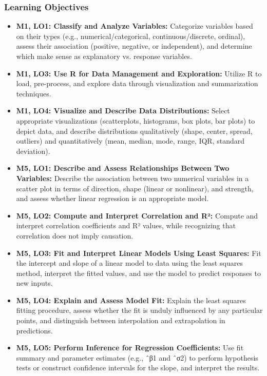 \begin{frame}
    \frametitle{Learning Objectives}
    \begin{itemize}
        \item \textbf{M1, LO1: Classify and Analyze Variables:} Categorize variables based on their types (e.g., numerical/categorical, continuous/discrete, ordinal), assess their association (positive, negative, or independent), and determine which make sense as explanatory vs. response variables.
        \item \textbf{M1, LO3: Use R for Data Management and Exploration:} Utilize R to load, pre-process, and explore data through visualization and summarization techniques.
        \item \textbf{M1, LO4: Visualize and Describe Data Distributions:} Select appropriate visualizations (scatterplots, histograms, box plots, bar plots) to depict data, and describe distributions qualitatively (shape, center, spread, outliers) and quantitatively (mean, median, mode, range, IQR, standard deviation).
        \item \textbf{M5, LO1: Describe and Assess Relationships Between Two Variables:} Describe the association between two numerical variables in a scatter plot in terms of direction, shape (linear or nonlinear), and strength, and assess whether linear regression is an appropriate model.    
        \item \textbf{M5, LO2: Compute and Interpret Correlation and R²:} Compute and interpret correlation coefficients and R² values, while recognizing that correlation does not imply causation. 
        \item \textbf{M5, LO3: Fit and Interpret Linear Models Using Least Squares:} Fit the intercept and slope of a linear model to data using the least squares method, interpret the fitted values, and use the model to predict responses to new inputs.
        \item \textbf{M5, LO4: Explain and Assess Model Fit:} Explain the least squares fitting procedure, assess whether the fit is unduly influenced by any particular points, and distinguish between interpolation and extrapolation in predictions.
        \item \textbf{M5, LO5: Perform Inference for Regression Coefficients:} Use fit summary and parameter estimates (e.g., ˆβ1 and ˆσ2) to perform hypothesis tests or construct confidence intervals for the slope, and interpret the results.
    \end{itemize}
\end{frame}
    
